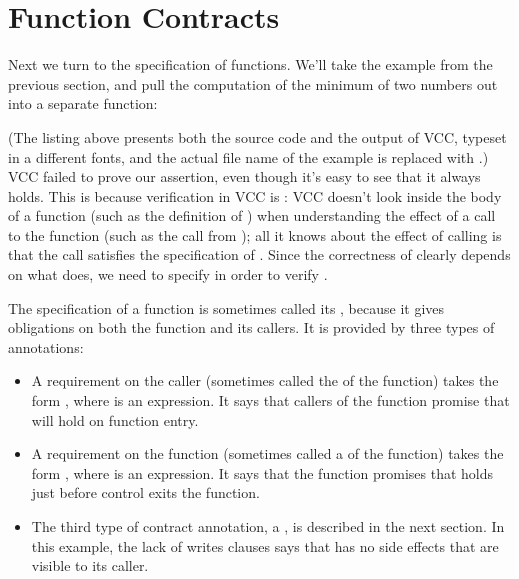 \section{Function Contracts}
\label{sect:functions}

Next we turn to the specification of functions. We'll take the example
from the previous section, and pull the computation of the minimum of
two numbers out into a separate function:


(The listing above presents both the source code and the output
of VCC, typeset in a different fonts, and 
the actual file name of the example is replaced with .)
VCC failed to prove our assertion, even though it's easy to see that
it always holds. This is because verification in VCC is : 
VCC doesn't look inside the body of a function (such as the definition of ) 
when understanding the effect of a call to the function (such as 
the call from );
all it knows about the effect of calling  is that the call 
satisfies the specification of . 
Since the correctness of  clearly depends on what 
does, we need to specify  in order to verify .

The specification of a function is sometimes called its ,
because it gives obligations on both the function and its callers. It
is provided by three types of annotations:
\begin{itemize}
\item A requirement on the caller (sometimes called the
   of the function) takes the form , 
  where  is an expression. It says that callers of the
  function promise that  will hold on function entry. 

\item A requirement on the function (sometimes called a
   of the function) takes the form , 
  where  is an expression. It says that the function
  promises that  holds just before control exits the
  function. 

\item The third type of contract annotation, a , is described
  in the next section. In this example, the lack of writes clauses says that 
  has no side effects that are visible to its caller.
\end{itemize}


